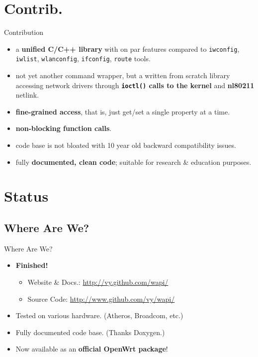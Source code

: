\documentclass[turkish,12pt,red,compress,mathserif]{beamer}
\begin{document}
\section{Contrib.}

\begin{frame}{Contribution}
  \begin{itemize}
  \item a \textbf{unified C/C++ library} with on par features compared to
    \texttt{iwconfig}, \texttt{iwlist}, \texttt{wlanconfig}, \texttt{ifconfig},
    \texttt{route} tools.
  \item not yet another command wrapper, but a written from scratch library
    accessing network drivers through \textbf{\texttt{ioctl()} calls to the
      kernel} and \textbf{nl80211} netlink.
  \item \textbf{fine-grained access}, that is, just get/set a single property at
    a time.
  \item \textbf{non-blocking function calls}.
  \item code base is not bloated with 10 year old backward compatibility issues.
  \item fully \textbf{documented, clean code}; suitable for research \&
    education purposes.
  \end{itemize}
\end{frame}


\section{Status}

\subsection{Where Are We?}

\begin{frame}{Where Are We?}
  \begin{itemize}
  \item \textbf{Finished!}
    \begin{itemize}
    \item Website \& Docs.: \url{http://vy.github.com/wapi/}
    \item Source Code: \url{http://www.github.com/vy/wapi/}
    \end{itemize}
  \item Tested on various hardware. (Atheros, Broadcom, etc.)
  \item Fully documented code base. (Thanks Doxygen.)
  \item Now available as an \textbf{official OpenWrt package}!
  \end{itemize}
\end{frame}
\end{document}
